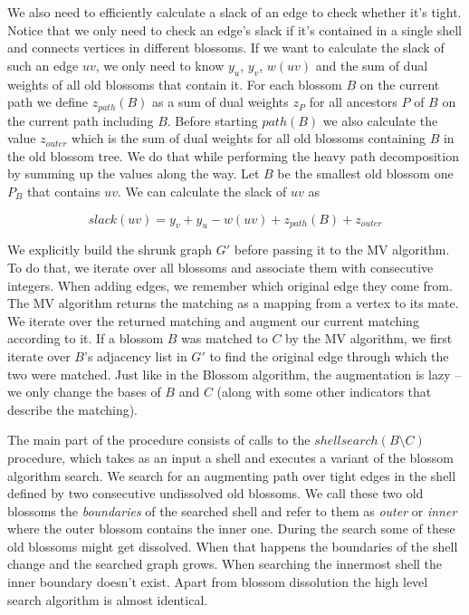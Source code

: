 We also need to efficiently calculate a slack of an edge to check whether it's tight. Notice that we only need to check an edge's slack if it's contained in a single shell and connects vertices in different blossoms. If we want to calculate the slack of such an edge $uv$, we only need to know $y_u$, $y_v$, $w(uv)$ and the sum of dual weights of all old blossoms that contain it. For each blossom $B$ on the current path we define $z_{path}(B)$ as a sum of dual weights $z_P$ for all ancestors $P$ of $B$ on the current path including $B$. Before starting $path(B)$ we also calculate the value $z_{outer}$ which is the sum of dual weights for all old blossoms containing $B$ in the old blossom tree. We do that while performing the heavy path decomposition by summing up the values along the way. Let $B$ be the smallest old blossom one $P_B$ that contains $uv$. We can calculate the slack of $uv$ as

\[ slack(uv) = y_v + y_u - w(uv) + z_{path}(B) + z_{outer} \]

We explicitly build the shrunk graph $G'$ before passing it to the MV algorithm. To do that, we iterate over all blossoms and associate them with consecutive integers. When adding edges, we remember which original edge they come from. The MV algorithm returns the matching as a mapping from a vertex to its mate. We iterate over the returned matching and augment our current matching according to it. If a blossom $B$ was matched to $C$ by the MV algorithm, we first iterate over $B$'s adjacency list in $G'$ to find the original edge through which the two were matched. Just like in the Blossom algorithm, the augmentation is lazy – we only change the bases of $B$ and $C$ (along with some other indicators that describe the matching).

The main part of the procedure consists of calls to the $shellsearch(B \setminus C)$ procedure, which takes as an input a shell and executes a variant of the blossom algorithm search. We search for an augmenting path over tight edges in the shell defined by two consecutive undissolved old blossoms. We call these two old blossoms the \textit{boundaries} of the searched shell and refer to them as \textit{outer} or \textit{inner} where the outer blossom contains the inner one. During the search some of these old blossoms might get dissolved. When that happens the boundaries of the shell change and the searched graph grows. When searching the innermost shell the inner boundary doesn't exist. Apart from blossom dissolution the high level search algorithm is almost identical.

